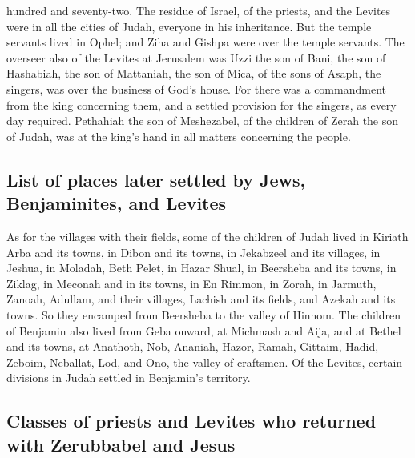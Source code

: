 hundred and seventy-two.  The residue of Israel, of the
priests, and the Levites were in all the cities of Judah, everyone in
his inheritance.  But the temple servants lived in Ophel;
and Ziha and Gishpa were over the temple servants.  The
overseer also of the Levites at Jerusalem was Uzzi the son of Bani, the
son of Hashabiah, the son of Mattaniah, the son of Mica, of the sons of
Asaph, the singers, was over the business of God's house.
 For there was a commandment from the king concerning
them, and a settled provision for the singers, as every day required.
 Pethahiah the son of Meshezabel, of the children of
Zerah the son of Judah, was at the king's hand in all matters concerning
the people.

\hypertarget{list-of-places-later-settled-by-jews-benjaminites-and-levites}{%
\subsection{List of places later settled by Jews, Benjaminites, and
Levites}\label{list-of-places-later-settled-by-jews-benjaminites-and-levites}}

 As for the villages with their fields, some of the
children of Judah lived in Kiriath Arba and its towns, in Dibon and its
towns, in Jekabzeel and its villages,  in Jeshua, in
Moladah, Beth Pelet,  in Hazar Shual, in Beersheba and
its towns,  in Ziklag, in Meconah and in its towns,
 in En Rimmon, in Zorah, in Jarmuth, 
Zanoah, Adullam, and their villages, Lachish and its fields, and Azekah
and its towns. So they encamped from Beersheba to the valley of Hinnom.
 The children of Benjamin also lived from Geba onward, at
Michmash and Aija, and at Bethel and its towns,  at
Anathoth, Nob, Ananiah,  Hazor, Ramah, Gittaim,
 Hadid, Zeboim, Neballat,  Lod, and Ono,
the valley of craftsmen.  Of the Levites, certain
divisions in Judah settled in Benjamin's territory.

\hypertarget{classes-of-priests-and-levites-who-returned-with-zerubbabel-and-jesus}{%
\subsection{Classes of priests and Levites who returned with Zerubbabel
and
Jesus}\label{classes-of-priests-and-levites-who-returned-with-zerubbabel-and-jesus}}

